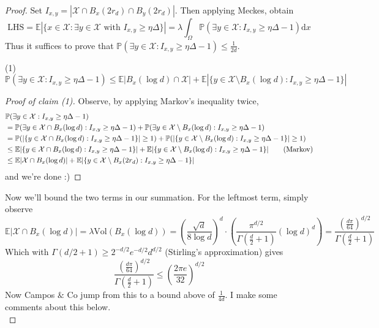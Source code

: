 \documentclass{article}
\begin{document}
\begin{proof}
    Set $I_{x,y} = |\mathcal{X} \cap B_x(2r_d) \cap B_y(2r_d)|$. Then applying Meckes, obtain 
    \[\text{LHS} = \mathbb{E}\left|\{x \in \mathcal{X} : \exists y \in \mathcal{X} \text{ with } I_{x,y}
    \geq \eta \Delta\}\right| = \lambda \int_{\Omega}\mathbb{P}(\exists y \in \mathcal{X} : I_{x,y} \geq 
    \eta \Delta -1)\mathrm{d}x\] 
    Thus it suffices to prove that $\mathbb{P}(\exists y \in \mathcal{X} : I_{x,y} \geq \eta \Delta - 1) \leq \frac{1}{2d}$.
    \begin{claim}[]{(1)}
        \[\mathbb{P}(\exists y \in \mathcal{X} : I_{x,y} \geq \eta \Delta -1) \leq \mathbb{E}|B_x(\log d) \cap \mathcal{X}|
        + \mathbb{E}|\{y \in \mathcal{X} \setminus B_x(\log d) : I_{x,y} \geq \eta \Delta - 1\}|\]
    \end{claim}

    \begin{proof}[Proof of claim (1)]
        Observe, by applying Markov's inequality twice,
        \begin{align*}
            &\mathbb{P}(\exists y \in \mathcal{X} : I_{x,y} \geq \eta \Delta - 1) \\
             &= \mathbb{P}(\exists y \in \mathcal{X} \cap B_x(\log d) : I_{x,y} \geq \eta \Delta - 1)
            + \mathbb{P}(\exists y \in \mathcal{X} \setminus B_x(\log d) : I_{x,y} \geq \eta \Delta - 1) \\
            &= \mathbb{P}(|\{y \in \mathcal{X} \cap B_x(\log d) : I_{x,y} \geq \eta \Delta - 1\}| \geq 1) + 
            \mathbb{P}(|\{y \in \mathcal{X} \setminus B_x(\log d) : I_{x,y} \geq \eta \Delta - 1\}| \geq 1) \\
            &\leq \mathbb{E}|\{y \in \mathcal{X} \cap B_x(\log d) : I_{x,y} \geq \eta \Delta - 1\}| + 
            \mathbb{E}|\{y \in \mathcal{X} \setminus B_x(\log d) : I_{x,y} \geq \eta \Delta - 1\}| 
            \tag{\text{Markov}} \\
            &\leq \mathbb{E}|\mathcal{X} \cap B_x(\log d)| + \mathbb{E}|\{y \in \mathcal{X} \setminus B_x(2r_d) : I_{x,y} \geq \eta \Delta - 1\}| 
        \end{align*}
        and we're done :)
    \end{proof}
    Now we'll bound the two terms in our summation. For the leftmost term, simply observe 
    \[\mathbb{E}|\mathcal{X} \cap B_x(\log d)| = \lambda \text{Vol}(B_x(\log d)) 
    = \left(\frac{\sqrt{d}}{8\log d}\right)^d \cdot \left(\frac{\pi^{d/2}}{\Gamma(\frac{d}{2} + 1)}(\log d)^d\right)
    = \frac{\left(\frac{d\pi}{64}\right)^{d/2}}{\Gamma(\frac{d}{2} + 1)}\]
    Which with $\Gamma(d/2 + 1) \geq 2^{-d/2}e^{-d/2}d^{d/2}$ (Stirling's approximation) gives 
    \[\frac{\left(\frac{d\pi}{64}\right)^{d/2}}{\Gamma(\frac{d}{2} + 1)} \leq \left(\frac{2\pi e}{32}\right)^{d/2}\]
    Now Campos $\&$ Co jump from this to a bound above of $\frac{1}{4d}$. I make some comments about this below. \\


\end{proof}
\end{document}
